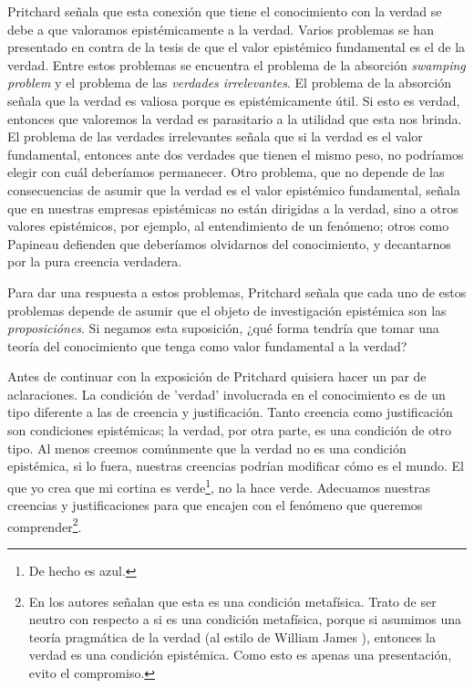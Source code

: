 \documentclass[12pt]{article}
\begin{document}
Pritchard señala que esta conexión que tiene el conocimiento con la verdad se debe a que valoramos epistémicamente a la verdad. Varios problemas se han presentado en contra de la tesis de que el valor epistémico fundamental es el de la verdad. Entre estos problemas se encuentra el problema de la absorción \textit{swamping problem} y el problema de las \textit{verdades irrelevantes}. El problema de la absorción señala que la verdad es valiosa porque es epistémicamente útil. Si esto es verdad, entonces que valoremos la verdad es parasitario a la utilidad que esta nos brinda. El problema de las verdades irrelevantes señala que si la verdad es el valor fundamental, entonces ante dos verdades que tienen el mismo peso, no podríamos elegir con cuál deberíamos permanecer. Otro problema, que no depende de las consecuencias de asumir que la verdad es el valor epistémico fundamental, señala que en nuestras empresas epistémicas no están dirigidas a la verdad, sino a otros valores epistémicos, por ejemplo, al entendimiento de un fenómeno; otros como Papineau \cite{Papineau2021} defienden que deberíamos olvidarnos del conocimiento, y decantarnos por la pura creencia verdadera.

Para dar una respuesta a estos problemas, Pritchard señala que cada uno de estos problemas depende de asumir que el objeto de investigación epistémica son las \textit{proposiciónes}. Si negamos esta suposición, ¿qué forma tendría que tomar una teoría del conocimiento que tenga como valor fundamental a la verdad?

Antes de continuar con la exposición de Pritchard quisiera hacer un par de aclaraciones. La condición de 'verdad' involucrada en el conocimiento es de un tipo diferente a las de creencia y justificación. Tanto creencia como justificación son condiciones epistémicas; la verdad, por otra parte, es una condición de otro tipo. Al menos creemos comúnmente que la verdad no es una condición epistémica, si lo fuera, nuestras creencias podrían modificar cómo es el mundo. El que yo crea que mi cortina es verde\footnote{De hecho es azul.}, no la hace verde. Adecuamos nuestras creencias y justificaciones para que encajen con el fenómeno que queremos comprender\footnote{En \cite{sep-knowledge-analysis} los autores señalan que esta es una condición metafísica. Trato de ser neutro con respecto a si es una condición metafísica, porque si asumimos una teoría pragmática de la verdad (al estilo de William James ), entonces la verdad es una condición epistémica. Como esto es apenas una presentación, evito el compromiso.}.  
\end{document}
